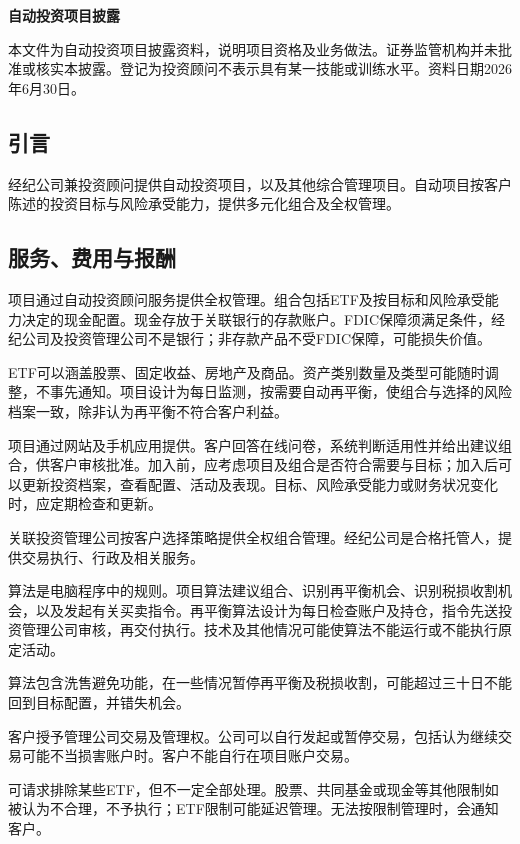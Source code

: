 \documentclass[UTF8,fontset=none,11pt,a4paper]{ctexart}
\begin{document}
{\noindent\fontsize{20}{25}\selectfont\bfseries 自动投资项目披露\par}
\vspace{10pt}
本文件为自动投资项目披露资料，说明项目资格及业务做法。证券监管机构并未批准或核实本披露。登记为投资顾问不表示具有某一技能或训练水平。资料日期2026年6月30日。


\subsection*{引言}
经纪公司兼投资顾问提供自动投资项目，以及其他综合管理项目。自动项目按客户陈述的投资目标与风险承受能力，提供多元化组合及全权管理。


\subsection*{服务、费用与报酬}
项目通过自动投资顾问服务提供全权管理。组合包括ETF及按目标和风险承受能力决定的现金配置。现金存放于关联银行的存款账户。FDIC保障须满足条件，经纪公司及投资管理公司不是银行；非存款产品不受FDIC保障，可能损失价值。


ETF可以涵盖股票、固定收益、房地产及商品。资产类别数量及类型可能随时调整，不事先通知。项目设计为每日监测，按需要自动再平衡，使组合与选择的风险档案一致，除非认为再平衡不符合客户利益。


项目通过网站及手机应用提供。客户回答在线问卷，系统判断适用性并给出建议组合，供客户审核批准。加入前，应考虑项目及组合是否符合需要与目标；加入后可以更新投资档案，查看配置、活动及表现。目标、风险承受能力或财务状况变化时，应定期检查和更新。


关联投资管理公司按客户选择策略提供全权组合管理。经纪公司是合格托管人，提供交易执行、行政及相关服务。


算法是电脑程序中的规则。项目算法建议组合、识别再平衡机会、识别税损收割机会，以及发起有关买卖指令。再平衡算法设计为每日检查账户及持仓，指令先送投资管理公司审核，再交付执行。技术及其他情况可能使算法不能运行或不能执行原定活动。


算法包含洗售避免功能，在一些情况暂停再平衡及税损收割，可能超过三十日不能回到目标配置，并错失机会。


客户授予管理公司交易及管理权。公司可以自行发起或暂停交易，包括认为继续交易可能不当损害账户时。客户不能自行在项目账户交易。


可请求排除某些ETF，但不一定全部处理。股票、共同基金或现金等其他限制如被认为不合理，不予执行；ETF限制可能延迟管理。无法按限制管理时，会通知客户。
\end{document}
